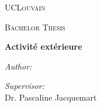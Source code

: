 
\begin{center}
\vspace*{.06\textheight}
{\scshape\LARGE UCLouvain\par}\vspace{1.5cm} %
\textsc{\Large Bachelor Thesis}\\[0.5cm] %

{\huge \bfseries Activité extérieure\par}\vspace{0.4cm} %
 
\begin{minipage}[t]{0.4\textwidth}
\begin{flushleft} \large
\emph{Author:}\\
\theauthor %
\end{flushleft}
\end{minipage}
\begin{minipage}[t]{0.4\textwidth}
\begin{flushright} \large
\emph{Supervisor:} \\
Dr. Pascaline Jacquemart %
\end{flushright}
\end{minipage}\\[3cm]
 
 
\vfill
\end{center}